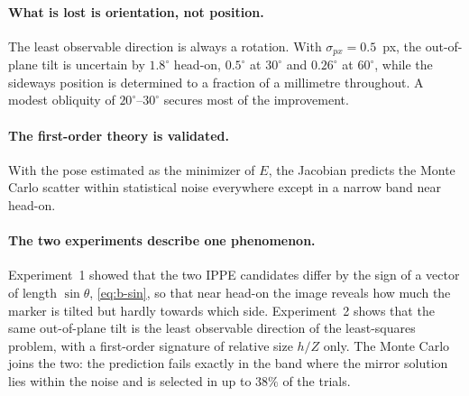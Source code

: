 \documentclass[11pt,a4paper]{article}
\theoremstyle{definition}
\theoremstyle{plain}
\theoremstyle{remark}
\begin{document}
\paragraph{What is lost is orientation, not position.} The least observable
direction is always a rotation. With $\sigma_{px} = 0.5$~px, the out-of-plane
tilt is uncertain by $1.8^\circ$ head-on, $0.5^\circ$ at $30^\circ$ and
$0.26^\circ$ at $60^\circ$, while the sideways position is determined to a
fraction of a millimetre throughout. A modest obliquity of $20^\circ$--$30^\circ$
secures most of the improvement.

\paragraph{The first-order theory is validated.} With the pose estimated as the
minimizer of $E$, the Jacobian predicts the Monte Carlo scatter within
statistical noise everywhere except in a narrow band near head-on.

\paragraph{The two experiments describe one phenomenon.} Experiment~1 showed that
the two IPPE candidates differ by the sign of a vector of length
$\sin\theta$, \eqref{eq:b-sin}, so that near head-on the image
reveals how much the marker is tilted but hardly towards which side.
Experiment~2 shows that the same out-of-plane tilt is the least observable
direction of the least-squares problem, with a first-order signature of relative
size $h/Z$ only. The Monte Carlo joins the two: the prediction fails exactly in
the band where the mirror solution lies within the noise and is selected in up
to $38\%$ of the trials.
\FloatBarrier
\end{document}
